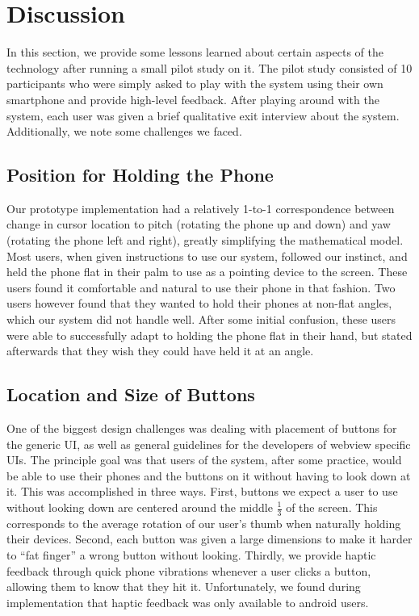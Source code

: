 \section{Discussion}

In this section, we provide some lessons learned about certain
aspects of the technology after running a small pilot study on
it. The pilot study consisted of 10 participants who were simply
asked to play with the system using their own smartphone and
provide high-level feedback. After playing around with the system,
each user was given a brief qualitative exit interview about the
system. Additionally, we note some challenges we faced.

\subsection{Position for Holding the Phone}

Our prototype implementation had a relatively 1-to-1
correspondence between change in cursor location to pitch (rotating
the phone up and down) and yaw (rotating the phone left and right),
greatly simplifying the mathematical model. Most users, when given
instructions to use our system, followed our instinct, and held the
phone flat in their palm to use as a pointing device to the screen.
These users found it comfortable and natural to use their phone in
that fashion. Two users however found that they wanted to hold
their phones at non-flat angles, which our system did not handle well.
After some initial confusion, these users were able to successfully
adapt to holding the phone flat in their hand, but stated afterwards
that they wish they could have held it at an angle.

\subsection{Location and Size of Buttons}

One of the biggest design challenges was dealing with placement of
buttons for the generic UI, as well as general guidelines for the
developers of webview specific UIs. The principle goal was that
users of the system, after some practice, would be able to use
their phones and the buttons on it without having to look down
at it. This was accomplished in three ways. First, buttons we expect a
user to use without looking down are centered around the middle
$\frac{1}{3}$ of the screen. This corresponds to the average rotation
of our user's thumb when naturally holding their devices. Second,
each button was given a large dimensions to make it harder to ``fat
finger'' a wrong button without looking. Thirdly, we provide haptic
feedback through quick phone vibrations whenever a user clicks a
button, allowing them to know that they hit it. Unfortunately, we
found during implementation that haptic feedback was only available
to android users.

